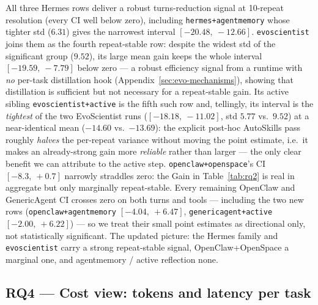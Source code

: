 \documentclass{article}
\begin{document}
All three Hermes rows deliver a robust turns-reduction signal at 10-repeat resolution (every CI well below zero), including \texttt{hermes+agentmemory} whose tighter std ($6.31$) gives the narrowest interval $[-20.48,\ -12.66]$. \texttt{evoscientist} joins them as the fourth repeat-stable row: despite the widest std of the significant group ($9.52$), its large mean gain keeps the whole interval $[-19.59,\ -7.79]$ below zero --- a robust efficiency signal from a runtime with \emph{no} per-task distillation hook (Appendix~\ref{sec:evo-mechanisms}), showing that distillation is sufficient but not necessary for a repeat-stable gain. Its active sibling \texttt{evoscientist+active} is the fifth such row and, tellingly, its interval is the \emph{tightest} of the two EvoScientist runs ($[-18.18,\ -11.02]$, std $5.77$ vs.\ $9.52$) at a near-identical mean ($-14.60$ vs.\ $-13.69$): the explicit post-hoc AutoSkills pass roughly \emph{halves} the per-repeat variance without moving the point estimate, i.e.\ it makes an already-strong gain more \emph{reliable} rather than larger --- the only clear benefit we can attribute to the active step. \texttt{openclaw+openspace}'s CI $[-8.3,\ +0.7]$ narrowly straddles zero: the Gain in Table~\ref{tab:rq2} is real in aggregate but only marginally repeat-stable. Every remaining OpenClaw and GenericAgent CI crosses zero on both turns and tools --- including the two new rows (\texttt{openclaw+agentmemory} $[-4.04,\ +6.47]$, \texttt{genericagent+active} $[-2.00,\ +6.22]$) --- so we treat their small point estimates as directional only, not statistically significant. The updated picture: the Hermes family and \texttt{evoscientist} carry a strong repeat-stable signal, OpenClaw+OpenSpace a marginal one, and agentmemory / active reflection none.

\subsection{RQ4 --- Cost view: tokens and latency per task}
\label{sec:rq4}
\end{document}
